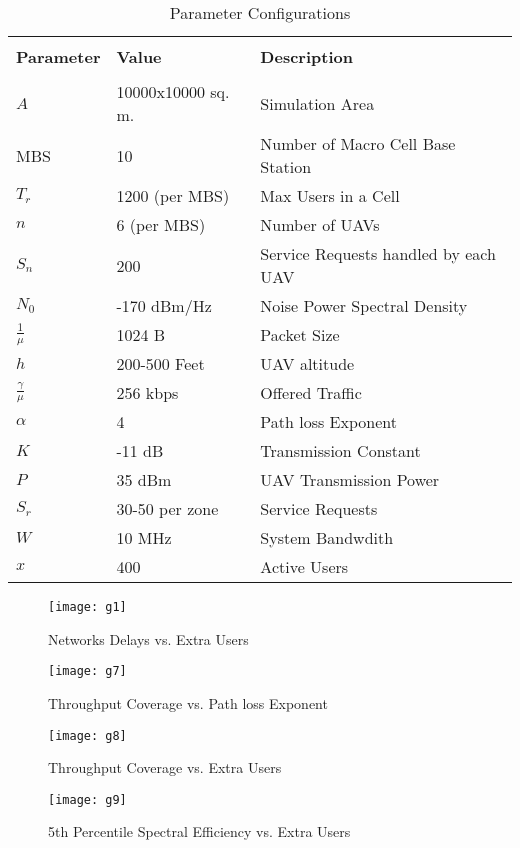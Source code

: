 \documentclass[journal]{IEEEtran}
\begin{document}
\begin{table}[!ht]
\fontsize{7}{9}\selectfont
\centering
\caption{Parameter Configurations}\label{self_conf}\begin{tabular}{l l l}
\hline\\
\textbf{Parameter} & \textbf{Value} & \textbf{Description}\\
\hline
\hline\\
$A$ & 10000x10000 sq. m. & Simulation Area\\
MBS & 10& Number of Macro Cell Base Station\\
$T_{r}$ & 1200 (per MBS) & Max Users in a Cell\\
$n$& 6 (per MBS)& Number of UAVs\\
$S_{n}$ & 200 & Service Requests handled by each UAV\\
$N_{0}$ & -170 dBm/Hz & Noise Power Spectral Density\\
$\frac{1}{\mu}$ & 1024 B&Packet Size \\
$h$ &200-500 Feet& UAV altitude\\
$\frac{\gamma}{\mu}$ & 256 kbps& Offered Traffic\\
$\alpha$& 4&Path loss Exponent\\
$K$ & -11 dB & Transmission Constant\\
$P$ & 35 dBm & UAV Transmission Power \\
$S_{r}$& 30-50 per zone& Service Requests\\
$W$ & 10 MHz& System Bandwdith\\
$x$ & 400 & Active Users\\
\hline
\end{tabular}
\end{table}\begin{figure}[!ht]
\begin{minipage}[t]{0.20\textwidth}
\centering
\texttt{[image: g1]}
\caption{\fontsize{6}{6}\selectfont Networks Delays vs. Extra Users }
\label{g1}
\end{minipage}
\hspace{\fill}
\begin{minipage}[t]{0.26\textwidth}
\centering
\texttt{[image: g7]}
\caption{\fontsize{6}{6}\selectfont Throughput Coverage vs. Path loss Exponent}
\label{g3}
\end{minipage}
\end{figure}
\begin{figure}[!ht]
\begin{minipage}[t]{0.20\textwidth}
\centering
\texttt{[image: g8]}
\caption{\fontsize{6}{6}\selectfont Throughput Coverage vs. Extra Users}
\label{g4}
\end{minipage}
\hspace{\fill}
\begin{minipage}[t]{0.26\textwidth}
\centering
\texttt{[image: g9]}
\caption{\fontsize{6}{6}\selectfont 5th Percentile Spectral Efficiency vs. Extra Users }
\label{g5}
\end{minipage}
\end{figure}
\end{document}
